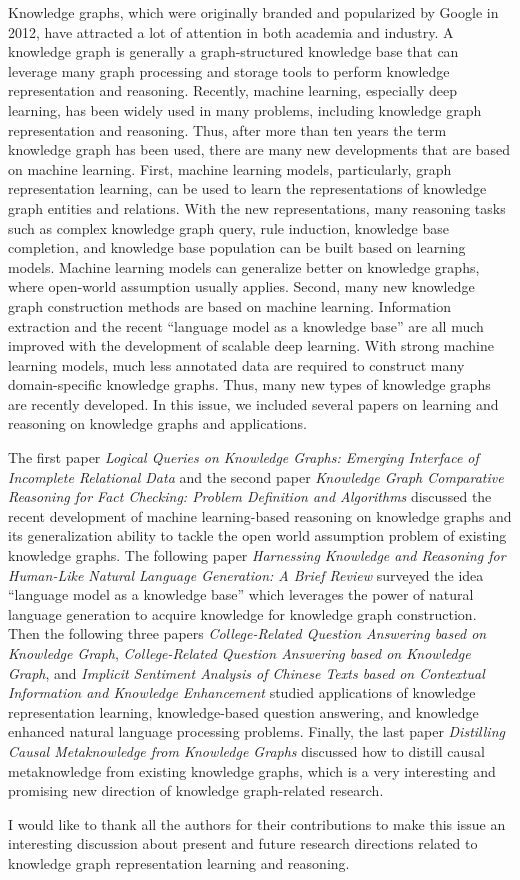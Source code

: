 \documentclass[11pt]{article}
\begin{document}
Knowledge graphs, which were originally branded and popularized by Google in 2012, have attracted a lot of attention in both academia and industry. A knowledge graph is generally a graph-structured knowledge base that can leverage many graph processing and storage tools to perform knowledge representation and reasoning. Recently, machine learning, especially deep learning, has been widely used in many problems, including knowledge graph representation and reasoning. Thus, after more than ten years the term knowledge graph has been used, there are many new developments that are based on machine learning. First, machine learning models, particularly, graph representation learning, can be used to learn the representations of knowledge graph entities and relations. With the new representations, many reasoning tasks such as complex knowledge graph query, rule induction, knowledge base completion, and knowledge base population can be built based on learning models. Machine learning models can generalize better on knowledge graphs, where open-world assumption usually applies. Second, many new knowledge graph construction methods are based on machine learning. Information extraction and the recent ``language model as a knowledge base'' are all much improved with the development of scalable deep learning. With strong machine learning models, much less annotated data are required to construct many domain-specific knowledge graphs. Thus, many new types of knowledge graphs are recently developed. In this issue, we included several papers on learning and reasoning on knowledge graphs and applications.


The first paper {\it Logical Queries on Knowledge Graphs: Emerging Interface of Incomplete Relational Data} and the second paper {\it Knowledge Graph Comparative Reasoning for Fact Checking: Problem Definition and Algorithms} discussed the recent development of machine learning-based reasoning on knowledge graphs and its generalization ability to tackle the open world assumption problem of existing knowledge graphs. The following  paper {\it Harnessing Knowledge and Reasoning for Human-Like Natural Language Generation: A Brief Review} surveyed the idea ``language model as a knowledge base'' which leverages the power of natural language generation to acquire knowledge for knowledge graph construction. Then the following three papers {\it College-Related Question Answering based on Knowledge Graph}, {\it College-Related Question Answering based on Knowledge Graph}, and {\it Implicit Sentiment Analysis of Chinese Texts based on Contextual Information and Knowledge Enhancement} studied applications of knowledge representation learning, knowledge-based question answering, and knowledge enhanced natural language processing problems. Finally, the last paper {\it Distilling Causal Metaknowledge from Knowledge Graphs} discussed how to distill causal metaknowledge from existing knowledge graphs, which is a very interesting and promising new direction of knowledge graph-related research.

I would like to thank all the authors for their contributions to make this issue an interesting discussion about present and future research directions related to knowledge graph representation learning and reasoning.
\end{document}

